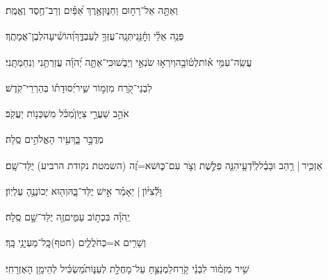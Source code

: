 \documentclass[12pt]{article}
\newcommand{\loc}[1]{\textsuperscript{\locf{#1}}}
\begin{document}
{\loc{ טו}~}‏וְאַתָּ֣ה  אֵל־רַח֣וּם וְחַנּ֑וּן{\hfill}אֶ֥רֶךְ אַ֝פַּ֗יִם וְרַב־חֶ֥סֶד וֶאֱמֶֽת׃\par

{\loc{ טז}~}‏פְּנֵ֥ה אֵלַ֗י וְחׇ֫נֵּ֥נִי{\hfill}תְּנָֽה־עֻזְּךָ֥ לְעַבְדֶּ֑ךָ\newline\hspace*{.5em}וְ֝הוֹשִׁ֗יעָה{\hfill}לְבֶן־אֲמָתֶֽךָ׃\par

{\loc{ יז}~}‏עֲשֵֽׂה־עִמִּ֥י א֗וֹת{\hfill}לְט֫וֹבָ֥ה\newline\hspace*{.5em}וְיִרְא֣וּ שֹׂנְאַ֣י וְיֵבֹ֑שׁוּ{\hfill}כִּֽי־אַתָּ֥ה יְ֝הֹוָ֗ה עֲזַרְתַּ֥נִי וְנִחַמְתָּֽנִי׃\par\pend
\ledpb
\pstart[\subsection*{\textcolor{red}{פרק פז}}]\label{פרק פז}
{\loc{ א}~}‏לִבְנֵי־קֹ֭רַח מִזְמ֣וֹר שִׁ֑יר{\hfill}יְ֝סוּדָת֗וֹ בְּהַרְרֵי־קֹֽדֶשׁ׃\par

{\loc{ ב}~}‏אֹהֵ֣ב  שַׁעֲרֵ֣י צִיּ֑וֹן{\hfill}מִ֝כֹּ֗ל מִשְׁכְּנ֥וֹת יַעֲקֹֽב׃\par

{\loc{ ג}~}‏ מְדֻבָּ֣ר בָּ֑ךְ{\hfill}עִ֖יר הָאֱלֹהִ֣ים סֶֽלָה׃\par

{\loc{ ד}~}‏אַזְכִּ֤יר |  רַ֥הַב וּבָבֶ֗ל{\hfill}לְֽיֹ֫דְעָ֥י\newline\hspace*{.5em}הִנֵּ֤ה פְלֶ֣שֶׁת וְצֹ֣ר עִם־כּ֑וּשׁ{\hfill}א=זֶ֝ה (השמטת נקודת הרביע) יֻלַּד־שָֽׁם׃\par

{\loc{ ה}~}‏וּ֥לְﬞצִיּ֨וֹן |  יֵאָמַ֗ר אִ֣ישׁ  יֻלַּד־בָּ֑הּ{\hfill}וְה֖וּא יְכוֹנְנֶ֣הָ עֶלְיֽוֹן׃\par

{\loc{ ו}~}‏יְֽהֹוָ֗ה  בִּכְת֣וֹב עַמִּ֑ים{\hfill}זֶ֖ה יֻלַּד־שָׁ֣ם סֶֽלָה׃\par

{\loc{ ז}~}‏וְשָׁרִ֥ים א=כְּחֹלֲלִ֑ים (חטף){\hfill}כׇּֽל־מַעְיָנַ֥י בָּֽךְ׃\par\pend
\ledpb
\pstart[\subsection*{\textcolor{red}{פרק פח}}]\label{פרק פח}
{\loc{ א}~}‏שִׁ֥יר מִזְמ֗וֹר לִבְנֵ֫י קֹ֥רַח\newline\hspace*{.5em}לַמְנַצֵּ֣חַ עַל־מָחֲלַ֣ת לְעַנּ֑וֹת{\hfill}מַ֝שְׂכִּ֗יל לְהֵימָ֥ן הָאֶזְרָחִֽי׃\par
\end{document}
